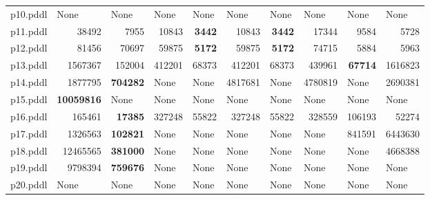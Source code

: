 \documentclass{article}
\begin{document}
\begin{tabular}{@{}lrrrrrrrrr@{}}
p10.pddl & \multicolumn{1}{|l|}{None} & \multicolumn{1}{|l|}{None} & \multicolumn{1}{|l|}{None} & \multicolumn{1}{|l|}{None} & \multicolumn{1}{|l|}{None} & \multicolumn{1}{|l|}{None} & \multicolumn{1}{|l|}{None} & \multicolumn{1}{|l|}{None} & \multicolumn{1}{|l|}{None} \\
p11.pddl & 38492 & 7955 & 10843 & \textbf{3442} & 10843 & \textbf{3442} & 17344 & 9584 & 5728 \\
p12.pddl & 81456 & 70697 & 59875 & \textbf{5172} & 59875 & \textbf{5172} & 74715 & 5884 & 5963 \\
p13.pddl & 1567367 & 152004 & 412201 & 68373 & 412201 & 68373 & 439961 & \textbf{67714} & 1616823 \\
p14.pddl & 1877795 & \textbf{704282} & \multicolumn{1}{|l|}{None} & \multicolumn{1}{|l|}{None} & 4817681 & \multicolumn{1}{|l|}{None} & 4780819 & \multicolumn{1}{|l|}{None} & 2690381 \\
p15.pddl & \textbf{10059816} & \multicolumn{1}{|l|}{None} & \multicolumn{1}{|l|}{None} & \multicolumn{1}{|l|}{None} & \multicolumn{1}{|l|}{None} & \multicolumn{1}{|l|}{None} & \multicolumn{1}{|l|}{None} & \multicolumn{1}{|l|}{None} & \multicolumn{1}{|l|}{None} \\
p16.pddl & 165461 & \textbf{17385} & 327248 & 55822 & 327248 & 55822 & 328559 & 106193 & 52274 \\
p17.pddl & 1326563 & \textbf{102821} & \multicolumn{1}{|l|}{None} & \multicolumn{1}{|l|}{None} & \multicolumn{1}{|l|}{None} & \multicolumn{1}{|l|}{None} & \multicolumn{1}{|l|}{None} & 841591 & 6443630 \\
p18.pddl & 12465565 & \textbf{381000} & \multicolumn{1}{|l|}{None} & \multicolumn{1}{|l|}{None} & \multicolumn{1}{|l|}{None} & \multicolumn{1}{|l|}{None} & \multicolumn{1}{|l|}{None} & \multicolumn{1}{|l|}{None} & 4668388 \\
p19.pddl & 9798394 & \textbf{759676} & \multicolumn{1}{|l|}{None} & \multicolumn{1}{|l|}{None} & \multicolumn{1}{|l|}{None} & \multicolumn{1}{|l|}{None} & \multicolumn{1}{|l|}{None} & \multicolumn{1}{|l|}{None} & \multicolumn{1}{|l|}{None} \\
p20.pddl & \multicolumn{1}{|l|}{None} & \multicolumn{1}{|l|}{None} & \multicolumn{1}{|l|}{None} & \multicolumn{1}{|l|}{None} & \multicolumn{1}{|l|}{None} & \multicolumn{1}{|l|}{None} & \multicolumn{1}{|l|}{None} & \multicolumn{1}{|l|}{None} & \multicolumn{1}{|l|}{None} \\
\end{tabular}

\hypertarget{h_values}{}
\end{document}
